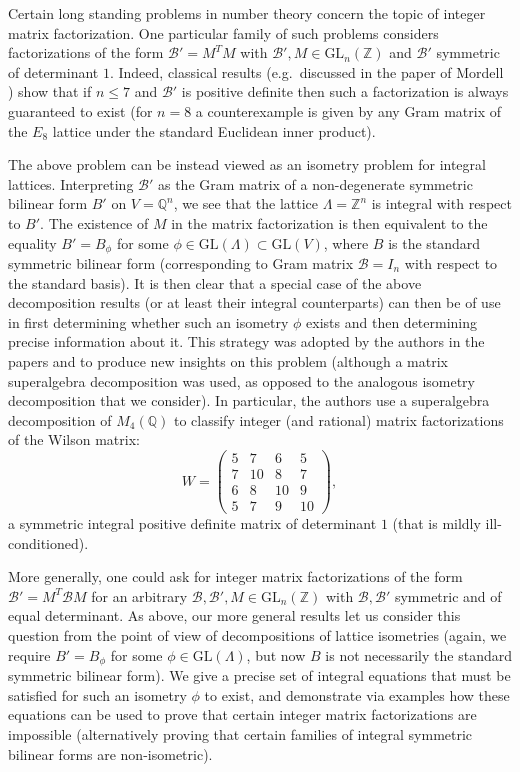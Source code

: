 \documentclass{amsart}
\theoremstyle{plain}
\theoremstyle{definition}
\begin{document}
Certain long standing problems in number theory concern the topic of integer matrix factorization. One particular family of such problems considers factorizations of the form $\mathcal{B}' = M^TM$ with $\mathcal{B}',M\in\text{GL}_n(\mathbb{Z})$ and $\mathcal{B}'$ symmetric of determinant $1$. Indeed, classical results (e.g.\ discussed in the paper of Mordell \cite{mordell}) show that if $n\leq 7$ and $\mathcal{B}'$ is positive definite then such a factorization is always guaranteed to exist (for $n=8$ a counterexample is given by any Gram matrix of the $E_8$ lattice under the standard Euclidean inner product).

The above problem can be instead viewed as an isometry problem for integral lattices. Interpreting $\mathcal{B}'$ as the Gram matrix of a non-degenerate symmetric bilinear form $B'$ on $V = \mathbb{Q}^n$, we see that the lattice $\Lambda = \mathbb{Z}^n$ is integral with respect to $B'$. The existence of $M$ in the matrix factorization is then equivalent to the equality $B' = B_{\phi}$ for some $\phi\in\text{GL}(\Lambda)\subset\text{GL}(V)$, where $B$ is the standard symmetric bilinear form (corresponding to Gram matrix $\mathcal{B} = I_n$ with respect to the standard basis). It is then clear that a special case of the above decomposition results (or at least their integral counterparts) can then be of use in first determining whether such an isometry $\phi$ exists and then determining precise information about it. This strategy was adopted by the authors in the papers \cite{higham} and \cite{lettington} to produce new insights on this problem (although a matrix superalgebra decomposition was used, as opposed to the analogous isometry decomposition that we consider). In particular, the authors use a superalgebra decomposition of $M_4(\mathbb{Q})$ to classify integer (and rational) matrix factorizations of the Wilson matrix: \[W = \begin{pmatrix}5 & 7 & 6 & 5\\ 7 & 10 & 8 & 7\\ 6 & 8 & 10 & 9\\ 5 & 7 & 9 & 10\end{pmatrix},\] a symmetric integral positive definite matrix of determinant $1$ (that is mildly ill-conditioned).

More generally, one could ask for integer matrix factorizations of the form $\mathcal{B}' = M^T\mathcal{B}M$ for an arbitrary $\mathcal{B},\mathcal{B}',M\in\text{GL}_n(\mathbb{Z})$ with $\mathcal{B},\mathcal{B}'$ symmetric and of equal determinant. As above, our more general results let us consider this question from the point of view of decompositions of lattice isometries (again, we require $B' = B_{\phi}$ for some $\phi\in \text{GL}(\Lambda)$, but now $B$ is not necessarily the standard symmetric bilinear form). We give a precise set of integral equations that must be satisfied for such an isometry $\phi$ to exist, and demonstrate via examples how these equations can be used to prove that certain integer matrix factorizations are impossible (alternatively proving that certain families of integral symmetric bilinear forms are non-isometric).
\end{document}

